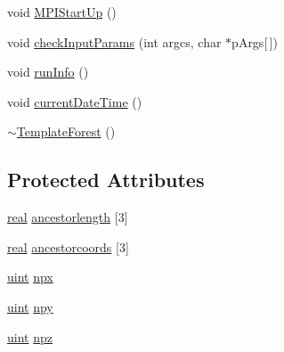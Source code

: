 \begin{DoxyCompactItemize}
\item 
void \mbox{\hyperlink{classTemplateForest_aec26a86ef4768ba448de15c612faf40d}{M\+P\+I\+Start\+Up}} ()
\item 
void \mbox{\hyperlink{classTemplateForest_aae43950b8b41ac3cc1568f7966f84d15}{check\+Input\+Params}} (int argcs, char $\ast$p\+Args\mbox{[}$\,$\mbox{]})
\item 
void \mbox{\hyperlink{classTemplateForest_a6894f2a77f8eba8e06bbbdf77ff39b61}{run\+Info}} ()
\item 
void \mbox{\hyperlink{classTemplateForest_a46d583a9f00ec3b0caf2067589a0ef8a}{current\+Date\+Time}} ()
\item 
\mbox{\hyperlink{classTemplateForest_a65c47765d20e839f0cb08b2119b628da}{$\sim$\+Template\+Forest}} ()
\end{DoxyCompactItemize}
\subsection*{Protected Attributes}
\begin{DoxyCompactItemize}
\item 
\mbox{\hyperlink{definitions_8h_aedc0ad84d1e764530814f57ad931d02a}{real}} \mbox{\hyperlink{classTemplateForest_a0a371d168c81cf8be77b681c27c06409}{ancestorlength}} \mbox{[}3\mbox{]}
\item 
\mbox{\hyperlink{definitions_8h_aedc0ad84d1e764530814f57ad931d02a}{real}} \mbox{\hyperlink{classTemplateForest_aa4644b5dd646be3d9e3d71107a33803a}{ancestorcoords}} \mbox{[}3\mbox{]}
\item 
\mbox{\hyperlink{definitions_8h_a69aa29b598b851b0640aa225a9e5d61d}{uint}} \mbox{\hyperlink{classTemplateForest_ac16738374c9880720dbb28de832a15f2}{npx}}
\item 
\mbox{\hyperlink{definitions_8h_a69aa29b598b851b0640aa225a9e5d61d}{uint}} \mbox{\hyperlink{classTemplateForest_afe37cbd294cd78c9f19cda314b21809e}{npy}}
\item 
\mbox{\hyperlink{definitions_8h_a69aa29b598b851b0640aa225a9e5d61d}{uint}} \mbox{\hyperlink{classTemplateForest_a8854c681d680f83d4a16a89f72b60b43}{npz}}
\end{DoxyCompactItemize}
